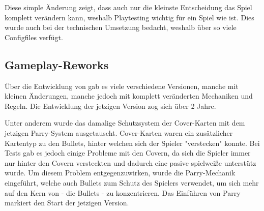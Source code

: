 Diese simple Änderung zeigt, dass auch nur die kleinste Entscheidung das Spiel komplett verändern kann, weshalb Playtesting
wichtig für ein Spiel wie \FF ist. Dies wurde auch bei der technischen Umsetzung bedacht, weshalb \FF über so viele Configfiles verfügt.


\subsection{Gameplay-Reworks}\label{subsec:placementMatters}
Über die Entwicklung von \FF gab es viele verschiedene Versionen, manche mit kleinen Änderungen, manche jedoch mit komplett veränderten Mechaniken und Regeln.
Die Entwicklung der jetzigen Version zog sich über 2 Jahre.


Unter anderem wurde das damalige Schutzsystem der Cover-Karten mit dem jetzigen Parry-System ausgetauscht.
Cover-Karten waren ein zusätzlicher Kartentyp zu den Bullets, hinter welchen sich der Spieler "verstecken" konnte.
Bei Tests gab es jedoch einige Probleme mit den Covern, da sich die Spieler immer nur hinter den Covern versteckten
und dadurch eine pasive spielweiße unterstütz wurde. Um diesem Problem entgegenzuwirken, wurde die Parry-Mechanik eingeführt,
welche auch Bullets zum Schutz des Spielers verwendet, um sich mehr auf den Kern von \FF - die Bullets - zu konzentrieren.
Das Einführen von Parry markiert den Start der jetzigen \FF Version.

\renewcommand{\kapitelautor}{}
